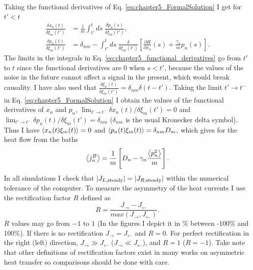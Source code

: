 %
Taking the functional derivatives of Eq. \eqref{eq:chapter5_FormalSolution} I get for $t'<t$
%
\begin{equation}
  \begin{split}
    \frac{\delta x_n(t)}{\delta \xi_m(t')} &= \frac{1}{m}\int_{t'}^{t} ds\; \frac{\delta p_n(s)}{\delta \xi_m(t')},
    \\
    \frac{\delta p_n(t)}{\delta \xi_m(t')} &= \delta_{nm} -\int_{t'}^{t} ds\;\frac{\delta}{\delta \xi_m(t')}\left[\frac{\partial H}{\partial x_n}(s) + \frac{\gamma_n}{m}p_n(s) \right].
  \end{split}
  \label{eq:chapter5_functional_derivatives}
\end{equation}
%
The limits in the integrals in Eq. \eqref{eq:chapter5_functional_derivatives} go from $t'$ to $t$ since the functional derivatives are $0$ when $s<t'$, because the values of the noise in the future cannot affect a signal in the present, which would break causality. I have also used that $\frac{\delta \xi_n(t)}{\delta \xi_m(t')} = \delta_{nm}\delta(t-t')$. Taking the limit $t'\to t^-$ in Eq. \eqref{eq:chapter5_FormalSolution} I obtain the values of the functional derivatives of $x_n$ and $p_n$, $ \lim_{t'\to t^-} \delta x_n(t)/\delta \xi_m(t') = 0$ and $\lim_{t'\to t^-} \delta p_n(t)/\delta \xi_m(t') = \delta_{nm}$ ($\delta_{nm}$ is the usual Kronecker delta symbol). Thus I have $\expval{x_n(t) \xi_m(t)} = 0$ and $\expval{p_n(t) \xi_m(t)} = \delta_{nm}D_m$, which gives for the heat flow from the baths
%
\begin{equation}
    \expval{j^B_n} = \frac{1}{m} \left[ D_n-\gamma_n \frac{\expval{p_n^2}}{m} \right].
    \label{eq:chapter5_BathHeatFlowNovikov}
\end{equation}
%
In all simulations I check that $|J_{L,{\rm steady}}|=|J_{R,{\rm steady}}|$ within the numerical tolerance of the computer. To measure the asymmetry of the heat currents I use the rectification factor $R$ defined as
%
\begin{equation}
    R = \frac{ J_\rightarrow - J_\leftarrow}{max(J_\rightarrow,J_\leftarrow)}.
    \label{eq:chapter5_R_Factor}
\end{equation}
%
$R$ values may go from $-1$ to $1$ (In the figures I depict it in \% between -100\% and 100\%). If there is no rectification $J_\rightarrow = J_\leftarrow $ and $R=0$. For perfect rectification in the right (left) direction, $J_\rightarrow \gg J_\leftarrow$ ($J_\rightarrow \ll J_\leftarrow$), and $R = 1$ ($R = -1$).
Take note that other  definitions of rectification factors exist in many works
on asymmetric heat transfer so comparisons should be done with care.
%

